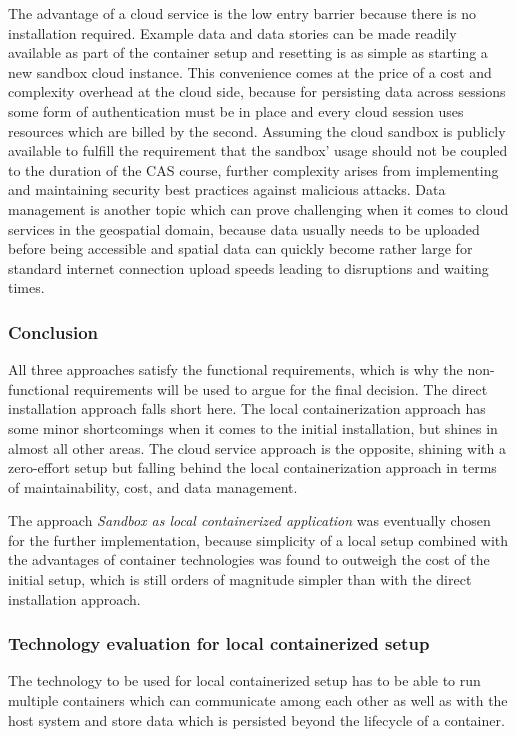 \documentclass[11pt, a4paper, oneside, parskip=full-]{scrartcl}
\begin{document}
The advantage of a cloud service is the low entry barrier because there is no
installation required. Example data and data stories can be made readily
available as part of the container setup and resetting is as simple as starting
a new sandbox cloud instance. This convenience comes at the price of a cost and
complexity overhead at the cloud side, because for persisting data across
sessions some form of authentication must be in place and every cloud session
uses resources which are billed by the second. Assuming the cloud sandbox is
publicly available to fulfill the requirement that the sandbox' usage should not
be coupled to the duration of the CAS course, further complexity arises from
implementing and maintaining security best practices against malicious attacks.
Data management is another topic which can prove challenging when it comes to
cloud services in the geospatial domain, because data usually needs to be
uploaded before being accessible and spatial data can quickly become rather
large for standard internet connection upload speeds leading to disruptions and
waiting times.

\subsubsection*{Conclusion}
All three approaches satisfy the functional requirements, which is why the
non-functional requirements will be used to argue for the final decision. The
direct installation approach falls short here. The local containerization
approach has some minor shortcomings when it comes to the initial installation,
but shines in almost all other areas. The cloud service approach is the
opposite, shining with a zero-effort setup but falling behind the local
containerization approach in terms of maintainability, cost, and data
management.

The approach \emph{Sandbox as local containerized application} was eventually
chosen for the further implementation, because simplicity of a local setup
combined with the advantages of container technologies was found to outweigh the
cost of the initial setup, which is still orders of magnitude simpler than with
the direct installation approach.

\subsubsection{Technology evaluation for local containerized setup}
The technology to be used for local containerized setup has to be able to run
multiple containers which can communicate among each other as well as with the
host system and store data which is persisted beyond the lifecycle of a
container.
\end{document}
